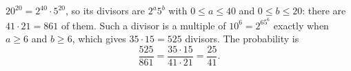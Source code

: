 $20^{20}=2^{40}\cdot5^{20}$, so its divisors are $2^a5^b$ with $0\le a\le40$ and $0\le b\le20$: there are $41\cdot21=861$ of them. Such a divisor is a multiple of $10^6=2^65^6$ exactly when $a\ge6$ and $b\ge6$, which gives $35\cdot15=525$ divisors. The probability is
\[\dfrac{525}{861}=\dfrac{35\cdot15}{41\cdot21}=\boxed{\dfrac{25}{41}}.\]

